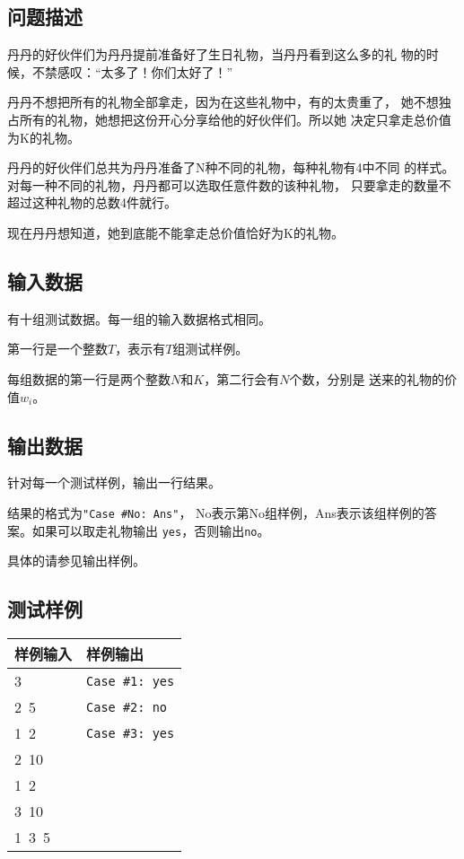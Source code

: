 \documentclass{article}
\begin{document}
\subsection*{问题描述}
丹丹的好伙伴们为丹丹提前准备好了生日礼物，当丹丹看到这么多的礼
物的时候，不禁感叹：“太多了！你们太好了！”

丹丹不想把所有的礼物全部拿走，因为在这些礼物中，有的太贵重了，
她不想独占所有的礼物，她想把这份开心分享给他的好伙伴们。所以她
决定只拿走总价值为K的礼物。

丹丹的好伙伴们总共为丹丹准备了N种不同的礼物，每种礼物有4中不同
的样式。对每一种不同的礼物，丹丹都可以选取任意件数的该种礼物，
只要拿走的数量不超过这种礼物的总数4件就行。

现在丹丹想知道，她到底能不能拿走总价值恰好为K的礼物。

\subsection*{输入数据}
有十组测试数据。每一组的输入数据格式相同。

第一行是一个整数$T$，表示有$T$组测试样例。

每组数据的第一行是两个整数$N$和$K$，第二行会有$N$个数，分别是
送来的礼物的价值$w_i$。

\subsection*{输出数据}
针对每一个测试样例，输出一行结果。

结果的格式为{\tt "Case \#No: Ans"}，
No表示第No组样例，Ans表示该组样例的答案。如果可以取走礼物输出
{\tt yes}，否则输出{\tt no}。

具体的请参见输出样例。

\subsection*{测试样例}
\begin{flushleft}
\begin{tabular}{|p{6cm}|p{6cm}|}
 \hline \bfseries{样例输入} & \bfseries{样例输出} \\
 \hline 
    3 & {\tt Case \#1: yes} \\
    2\ 5 & {\tt Case \#2: no} \\
    1\ 2 & {\tt Case \#3: yes} \\
    2\ 10 & \\
    1\ 2 & \\
    3\ 10 & \\
    1\ 3\ 5 & \\
 \hline 
\end{tabular}
\end{flushleft}
\end{document}
